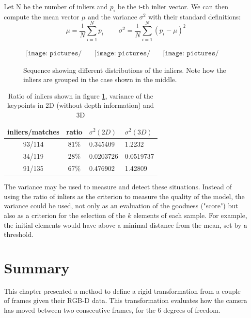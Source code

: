 Let N be the number of inliers and $p_i$ be the i-th inlier vector. We can then compute the mean vector $\mu$ and the variance $\sigma^2$ with their standard definitions:
\[
\mu = \frac{1}{N} \sum_{i=1}^N{p_i}
\;\;\;\;\;\;\;\;
\sigma^2 = \frac{1}{N} \sum_{i=1}^N{(p_i - \mu)^2}
\]

\begin{figure}[H]
\centering$
 \begin{array}{ccc}
 \texttt{[image: pictures/bad\_transform1]} &
 \texttt{[image: pictures/bad\_transform2]} &
 \texttt{[image: pictures/bad\_transform3]}
 \end{array}$
\caption{Sequence showing different distributions of the inliers. Note how the inliers are grouped in the case shown in the middle.}
\label{fig:bad_transform}
\end{figure}

\begin{table}[h]
\begin{center}
\begin{tabular}{ccll}
 inliers/matches & ratio & $\sigma^2(2D)$ & $\sigma^2(3D)$\\
 \hline
 93/114 &	81\% &	0.345409 &	1.2232\\
 34/119 &	28\% &	0.0203726 &	0.0519737\\
 91/135 &	67\% &	0.476902 &	1.42809\\
\end{tabular}
\end{center}
\caption{Ratio of inliers shown in figure \ref{fig:bad_transform}, variance of the keypoints in 2D (without depth information) and 3D}
\end{table}

The variance may be used to measure and detect these situations. Instead of using the ratio of inliers as the criterion to measure the quality of the model, the variance could be used, not only as an evaluation of the goodness ("score") but also as a criterion for the selection of the $k$ elements of each sample. For example, the initial elements would have above a minimal distance from the mean, set by a threshold.

\section{Summary}

This chapter presented a method to define a rigid transformation from a couple of frames given their RGB-D data. This transformation evaluates how the camera has moved between two consecutive frames, for the 6 degrees of freedom.

